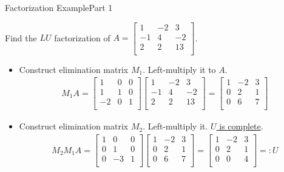 \documentclass[10pt]{beamer}
\begin{document}
\begin{frame}{Factorization Example}{Part 1}

\begin{example}
    Find the $LU$ factorization of $A  =
\begin{bmatrix}
1 & -2 & 3\\
-1 & 4 & -2\\
2 & 2 & 13\\
\end{bmatrix}$.
\end{example}

\begin{itemize}
    \item[1.] Construct elimination matrix $M_1$. Left-multiply it to $A$.
\begin{align*}
M_1 A = 
\begin{bmatrix}
1 & 0 & 0\\
1 & 1 & 0\\
-2 & 0 & 1\\
\end{bmatrix}
\begin{bmatrix}
\boxed{1} & -2 & 3\\
-1 & 4 & -2\\
2 & 2 & 13\\
\end{bmatrix} = \begin{bmatrix}
1 & -2 & 3\\
0 & 2 & 1\\
0 & 6 & 7\\
\end{bmatrix}
\end{align*}

\item[2.] Construct elimination matrix $M_2$. Left-multiply it. \underline{$U$ is complete}.
\begin{align*}
M_2 M_1 A = 
\begin{bmatrix}
1 & 0 & 0\\
0 & 1 & 0\\
0 & -3 & 1\\
\end{bmatrix}
\begin{bmatrix}
1 & -2 & 3\\
0 & \boxed{2} & 1\\
0 & 6 & 7\\
\end{bmatrix} = \begin{bmatrix}
1 & -2 & 3\\
0 & 2 & 1\\
0 & 0 & 4\\
\end{bmatrix} =: U
\end{align*}
\end{itemize}
\end{frame}
\end{document}
